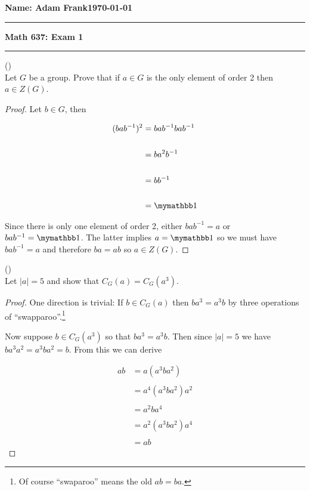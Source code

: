 \documentclass{exam}
\begin{document}
\noindent \textbf{Name: Adam Frank}\hfill \textbf{\today}

\vspace{.3cm}
\hrule
\begin{center}
{\bf \Large{Math 637: Exam 1}}
\end{center}
\hrule
\vspace{.3cm}


\begin{questions}
\question()\\
Let $G$ be a group.  Prove that if $a\in G$ is the only element of order 2 then $a\in Z(G)$.

\begin{proof}
  Let $b\in G$, then

\begin{align*}
  (bab^{-1})^2 &= bab^{-1}bab^{-1} \\\\
  &= ba^2b^{-1} \\\\
  &= bb^{-1} \\\\
  &= \mymathbb 1
\end{align*}

Since there is only one element of order 2, either $bab^{-1}=a$ or $bab^{-1}=\mymathbb 1$.  The latter implies $a=\mymathbb 1$ so we must have $bab^{-1}=a$ and therefore $ba=ab$ so $a\in Z(G)$.

\end{proof}

\vspace{1cm}

\question()\\
Let $|a|=5$ and show that $C_G(a)=C_G(a^3)$.

\begin{proof}
  One direction is trivial:  If $b\in C_G(a)$ then $ba^3 = a^3b$ by three operations of ``swapparoo''.\footnote{Of course ``swaparoo'' means the old $ab=ba$.}

  Now suppose $b\in C_G(a^3)$ so that $ba^3=a^3b$.  Then since $|a|=5$ we have $ba^3a^2=a^3ba^2=b$.  From this we can derive

  \begin{align*}
    ab &= a(a^3ba^2)\\\\
    &=a^4(a^3ba^2)a^2 \\\\
    &=a^2ba^4 \\\\
    &= a^2(a^3ba^2)a^4 \\\\
    &= ab
  \end{align*}
\end{proof}


\end{questions}
\end{document}
